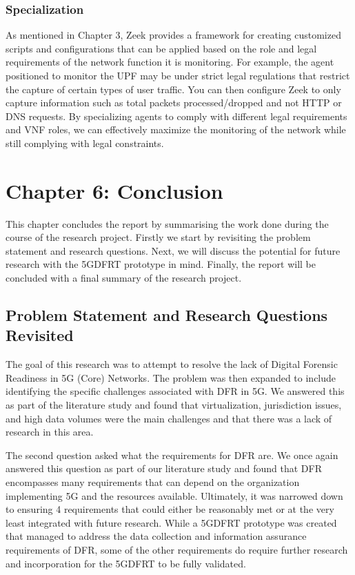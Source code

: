 \documentclass[final,1p,times,authoryear]{elsarticle}
\begin{document}
\subsubsection{Specialization}
\label{sub5sub5sec2}
As mentioned in Chapter 3, Zeek provides a framework for creating customized scripts and configurations that can be applied based on the role and legal requirements of the network function it is monitoring. For example, the agent positioned to monitor the UPF may be under strict legal regulations that restrict the capture of certain types of user traffic. You can then configure Zeek to only capture information such as total packets processed/dropped and not HTTP or DNS requests. By specializing agents to comply with different legal requirements and VNF roles, we can effectively maximize the monitoring of the network while still complying with legal constraints.

\newpage
\section{Chapter 6: Conclusion}
\label{sec6}
This chapter concludes the report by summarising the work done during the course of the research project. Firstly we start by revisiting the problem statement and research questions. Next, we will discuss the potential for future research with the 5GDFRT prototype in mind. Finally, the report will be concluded with a final summary of the research project.

\subsection{Problem Statement and Research Questions Revisited}
\label{sub6sec1}
The goal of this research was to attempt to resolve the lack of Digital Forensic Readiness in 5G (Core) Networks. The problem was then expanded to include identifying the specific challenges associated with DFR in 5G. We answered this as part of the literature study and found that virtualization, jurisdiction issues, and high data volumes were the main challenges and that there was a lack of research in this area.

\vspace{1em}

The second question asked what the requirements for DFR are. We once again answered this question as part of our literature study and found that DFR encompasses many requirements that can depend on the organization implementing 5G and the resources available. Ultimately, it was narrowed down to ensuring 4 requirements that could either be reasonably met or at the very least integrated with future research. While a 5GDFRT prototype was created that managed to address the data collection and information assurance requirements of DFR, some of the other requirements do require further research and incorporation for the 5GDFRT to be fully validated.
\end{document}
